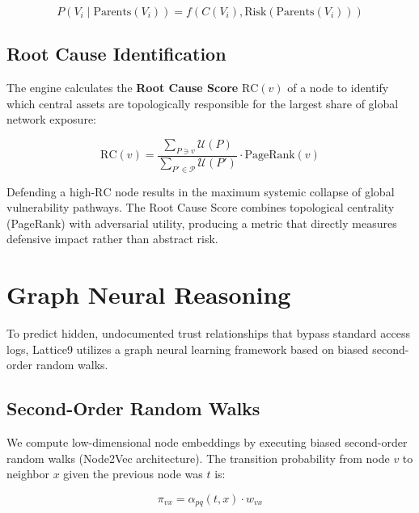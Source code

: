 \documentclass[11pt,a4paper]{article}
\theoremstyle{definition}
\numberwithin{equation}{section}
\newcommand{\set}[1]{\mathcal{#1}}
\begin{document}
\begin{equation}\label{eq:causal-net}
P(V_i \mid \text{Parents}(V_i)) = f\left( C(V_i), \text{Risk}(\text{Parents}(V_i)) \right)
\end{equation}

\subsection{Root Cause Identification}\label{subsec:root-cause}

The engine calculates the \textbf{Root Cause Score} $\text{RC}(v)$ of a node to identify which central assets are topologically responsible for the largest share of global network exposure:

\begin{equation}\label{eq:root-cause}
\text{RC}(v) = \frac{\displaystyle\sum_{P \ni v} \set{U}(P)}{\displaystyle\sum_{P' \in \set{P}} \set{U}(P')} \cdot \text{PageRank}(v)
\end{equation}

Defending a high-$\text{RC}$ node results in the maximum systemic collapse of global vulnerability pathways. The Root Cause Score combines topological centrality (PageRank) with adversarial utility, producing a metric that directly measures defensive impact rather than abstract risk.

\section{Graph Neural Reasoning}\label{sec:neural}

To predict hidden, undocumented trust relationships that bypass standard access logs, Lattice9 utilizes a graph neural learning framework based on biased second-order random walks.

\subsection{Second-Order Random Walks}\label{subsec:random-walks}

We compute low-dimensional node embeddings by executing biased second-order random walks (Node2Vec architecture). The transition probability from node $v$ to neighbor $x$ given the previous node was $t$ is:

\begin{equation}\label{eq:node2vec}
\pi_{vx} = \alpha_{pq}(t, x) \cdot w_{vx}
\end{equation}
\end{document}
